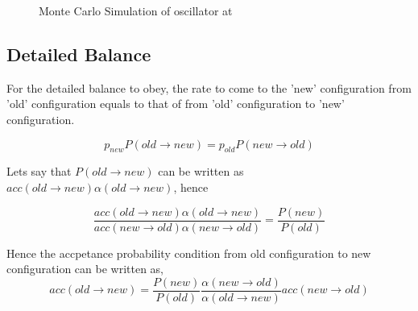 \documentclass{article}
\begin{document}
\begin{figure}[!tbp]
  \centering
{}
  \hfill
{}
  \caption{Monte Carlo Simulation of oscillator at }
\end{figure}

\subsection{Detailed Balance}
\label{sec-3-1}
For the detailed balance to obey, the rate to come to the 'new' configuration from 'old' configuration equals to that of from 'old' configuration to 'new' configuration.

\begin{equation}
p_{new} P(old \rightarrow new) = p_{old} P(new \rightarrow old)
\end{equation}

Lets say that $P(old \rightarrow new)$ can be written as $acc(old \rightarrow new) \alpha(old \rightarrow new)$,  hence

\begin{equation}
\frac{acc(old \rightarrow new)\alpha(old \rightarrow new)}{acc(new \rightarrow old)\alpha(new \rightarrow old)} = \frac{P(new)}{P(old)}
\end{equation}

Hence the accpetance probability condition from old configuration to new configuration can be written as,
\begin{equation}
acc(old \rightarrow new) = \frac{P(new)}{P(old)} \frac{\alpha(new \rightarrow old)}{\alpha(old \rightarrow new)} acc(new \rightarrow old)
\end{equation}
\end{document}
